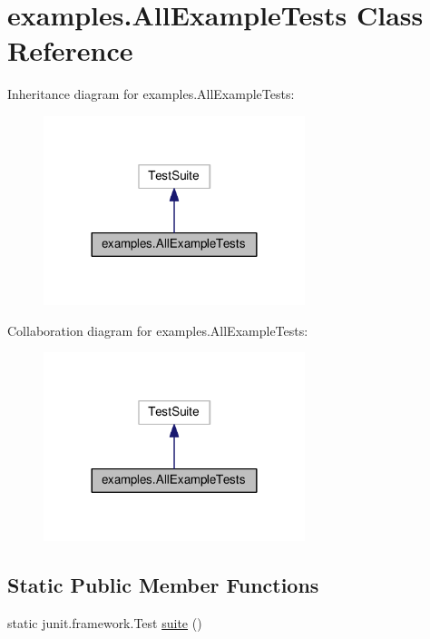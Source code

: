 \hypertarget{classexamples_1_1_all_example_tests}{\section{examples.\-All\-Example\-Tests Class Reference}
\label{classexamples_1_1_all_example_tests}
}


Inheritance diagram for examples.\-All\-Example\-Tests\-:
\nopagebreak
\begin{figure}[H]
\begin{center}
\leavevmode
\includegraphics[width=216pt]{classexamples_1_1_all_example_tests__inherit__graph}
\end{center}
\end{figure}


Collaboration diagram for examples.\-All\-Example\-Tests\-:
\nopagebreak
\begin{figure}[H]
\begin{center}
\leavevmode
\includegraphics[width=216pt]{classexamples_1_1_all_example_tests__coll__graph}
\end{center}
\end{figure}
\subsection*{Static Public Member Functions}
\begin{DoxyCompactItemize}
\item 
static junit.\-framework.\-Test \hyperlink{classexamples_1_1_all_example_tests_af6e9d52e94548d93a7a709e5b310dcea}{suite} ()
\end{DoxyCompactItemize}
